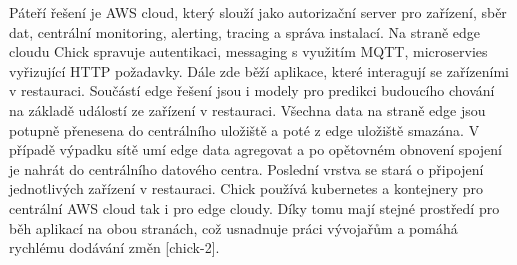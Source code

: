 	 Páteří řešení je AWS cloud, který slouží jako autorizační server pro zařízení, sběr dat, centrální monitoring, alerting, tracing a správa instalací. Na straně edge cloudu Chick spravuje autentikaci, messaging s využitím MQTT, microservies vyřizující HTTP požadavky. Dále zde běží aplikace, které interagují se zařízeními v restauraci. Součástí edge řešení jsou i modely pro predikci budoucího chování na základě událostí ze zařízení v restauraci. Všechna data na straně edge jsou potupně přenesena do centrálního uložiště a poté z edge uložiště smazána. V případě výpadku sítě umí edge data agregovat a po opětovném obnovení spojení je nahrát do centrálního datového centra. Poslední vrstva se stará o připojení jednotlivých zařízení v restauraci. Chick používá kubernetes a kontejnery pro centrální AWS cloud tak i pro edge cloudy. Díky tomu mají stejné prostředí pro běh aplikací na obou stranách, což usnadnuje práci vývojařům a pomáhá rychlému dodávání změn [chick-2].

